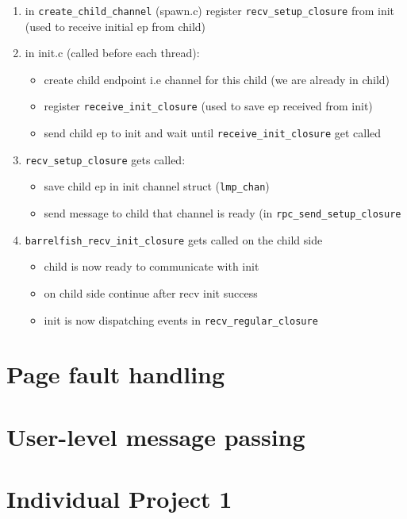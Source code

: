 \documentclass[11pt,a4paper]{report}
\begin{document}
\begin{enumerate}
    \item in \verb|create_child_channel| (spawn.c) register
    \verb|recv_setup_closure| from init
    (used to receive initial ep from child)

    \item in init.c (called before each thread): 
        \begin{itemize}
            \item create child endpoint i.e channel for this child (we are already in child)
            \item register \verb|receive_init_closure| (used to save ep received from init)
            \item send child ep to init and wait until
            \verb|receive_init_closure| get called
        \end{itemize}
    \item \verb|recv_setup_closure| gets called:
        \begin{itemize} 
            \item save child ep in init channel struct (\verb|lmp_chan|)
            \item send message to child that channel is ready (in
            \verb|rpc_send_setup_closure|
        \end{itemize}
    \item \verb|barrelfish_recv_init_closure| gets called on the child side
        \begin{itemize}
            \item child is now ready to communicate with init
            \item on child side continue after recv init success
            \item init is now dispatching events in \verb|recv_regular_closure|
        \end{itemize}
\end{enumerate}

\chapter{Page fault handling}




\chapter{User-level message passing}

\chapter{Individual Project 1}
\end{document}
